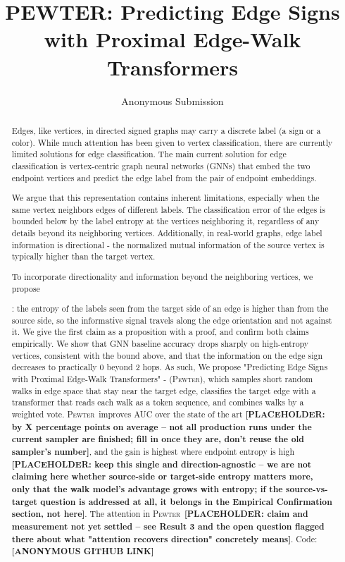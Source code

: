 \documentclass[letterpaper]{article} %
\title{PEWTER: Predicting Edge Signs with Proximal Edge-Walk Transformers}
\author{
Anonymous Submission
}
\newcommand{\method}{\textsc{Pewter}\xspace}
\newcommand{\ph}[1]{\textbf{[#1]}}  %
\theoremstyle{plain}
\theoremstyle{definition}
\begin{document}
\maketitle

\begin{abstract}
Edges, like vertices, in directed signed graphs may carry a discrete label (a sign or a color). While much attention has been given to vertex classification, there are currently limited solutions for edge classification. The main current solution for edge classification is vertex-centric graph neural networks (GNNs) that embed the two endpoint vertices and predict the edge label from the pair of endpoint embeddings. 

We argue that this representation contains inherent limitations, especially when the same vertex neighbors edges of different labels. The classification error of the edges is bounded below by the label entropy at the vertices neighboring it, regardless of any details beyond its neighboring vertices. Additionally, in real-world graphs, edge label information is directional - the normalized mutual information of the source vertex is typically higher than the target vertex. 

To incorporate directionality and information beyond the neighboring vertices, we propose 

: the entropy of the labels seen from the target side of an edge is higher than from the source side, so the informative signal travels along the edge orientation and not against it. We give the first claim as a proposition with a proof, and confirm both claims empirically. We show that GNN baseline accuracy drops sharply on high-entropy vertices, consistent with the bound above, and that the information on the edge sign decreases to practically 0 beyond 2 hops. As such, We propose "Predicting Edge Signs with Proximal Edge-Walk Transformers" - (\method), which samples short random walks in edge space that stay near the target edge, classifies the target edge with a transformer that reads each walk as a token sequence, and combines walks by a weighted vote. \method\ improves AUC over the state of the art \ph{PLACEHOLDER: by X percentage points on average -- not all production runs under the current sampler are finished; fill in once they are, don't reuse the old sampler's number}, and the gain is highest where endpoint entropy is high \ph{PLACEHOLDER: keep this single and direction-agnostic -- we are not claiming here whether source-side or target-side entropy matters more, only that the walk model's advantage grows with entropy; if the source-vs-target question is addressed at all, it belongs in the Empirical Confirmation section, not here}. The attention in \method\ \ph{PLACEHOLDER: claim and measurement not yet settled -- see Result 3 and the open question flagged there about what "attention recovers direction" concretely means}. Code: \ph{ANONYMOUS GITHUB LINK}
\end{abstract}
\end{document}
